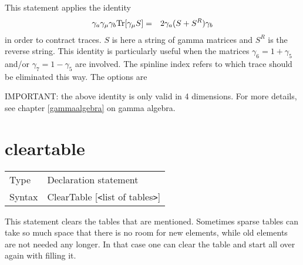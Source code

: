 \noindent This statement applies the identity
\begin{eqnarray}
    \gamma_a\gamma_\mu\gamma_b {\rm Tr}[\gamma_\mu S] & = &
         2\gamma_a( S + S^R ) \gamma_b  \nonumber
\end{eqnarray}
in order to contract traces. $S$ is here a string of
gamma matrices and $S^R$ is the reverse string. This 
identity is particularly useful when the matrices $\gamma_6 = 1+\gamma_5$ 
and/or $\gamma_7 = 1-\gamma_5$ are involved. The spinline index refers to 
which trace should be eliminated this way. The options are \vspace{1mm}
 


\noindent IMPORTANT: the above identity is only valid in 4 dimensions. For 
more details, see chapter \ref{gammaalgebra} on gamma algebra. \vspace{10mm}


\section{cleartable}
\label{substacleartable}

\noindent \begin{tabular}{ll}
Type & Declaration statement\\
Syntax & ClearTable [{\tt<}list of tables{\tt>}]
\end{tabular} \vspace{4mm}

\noindent This statement clears the tables that are mentioned. Sometimes 
sparse tables can take so much space that there is no room for new 
elements, while old elements are not needed any longer. In that case one 
can clear the table and start all over again with filling it.
\vspace{10mm}


